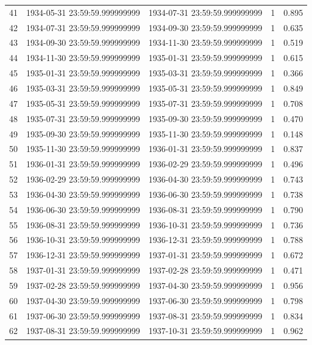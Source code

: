 \begin{table}
\begin{tabular}{lcccc}
41 & 1934-05-31 23:59:59.999999999 & 1934-07-31 23:59:59.999999999 & 1 & 0.895 \\
42 & 1934-07-31 23:59:59.999999999 & 1934-09-30 23:59:59.999999999 & 1 & 0.635 \\
43 & 1934-09-30 23:59:59.999999999 & 1934-11-30 23:59:59.999999999 & 1 & 0.519 \\
44 & 1934-11-30 23:59:59.999999999 & 1935-01-31 23:59:59.999999999 & 1 & 0.615 \\
45 & 1935-01-31 23:59:59.999999999 & 1935-03-31 23:59:59.999999999 & 1 & 0.366 \\
46 & 1935-03-31 23:59:59.999999999 & 1935-05-31 23:59:59.999999999 & 1 & 0.849 \\
47 & 1935-05-31 23:59:59.999999999 & 1935-07-31 23:59:59.999999999 & 1 & 0.708 \\
48 & 1935-07-31 23:59:59.999999999 & 1935-09-30 23:59:59.999999999 & 1 & 0.470 \\
49 & 1935-09-30 23:59:59.999999999 & 1935-11-30 23:59:59.999999999 & 1 & 0.148 \\
50 & 1935-11-30 23:59:59.999999999 & 1936-01-31 23:59:59.999999999 & 1 & 0.837 \\
51 & 1936-01-31 23:59:59.999999999 & 1936-02-29 23:59:59.999999999 & 1 & 0.496 \\
52 & 1936-02-29 23:59:59.999999999 & 1936-04-30 23:59:59.999999999 & 1 & 0.743 \\
53 & 1936-04-30 23:59:59.999999999 & 1936-06-30 23:59:59.999999999 & 1 & 0.738 \\
54 & 1936-06-30 23:59:59.999999999 & 1936-08-31 23:59:59.999999999 & 1 & 0.790 \\
55 & 1936-08-31 23:59:59.999999999 & 1936-10-31 23:59:59.999999999 & 1 & 0.736 \\
56 & 1936-10-31 23:59:59.999999999 & 1936-12-31 23:59:59.999999999 & 1 & 0.788 \\
57 & 1936-12-31 23:59:59.999999999 & 1937-01-31 23:59:59.999999999 & 1 & 0.672 \\
58 & 1937-01-31 23:59:59.999999999 & 1937-02-28 23:59:59.999999999 & 1 & 0.471 \\
59 & 1937-02-28 23:59:59.999999999 & 1937-04-30 23:59:59.999999999 & 1 & 0.956 \\
60 & 1937-04-30 23:59:59.999999999 & 1937-06-30 23:59:59.999999999 & 1 & 0.798 \\
61 & 1937-06-30 23:59:59.999999999 & 1937-08-31 23:59:59.999999999 & 1 & 0.834 \\
62 & 1937-08-31 23:59:59.999999999 & 1937-10-31 23:59:59.999999999 & 1 & 0.962 \\

\end{tabular}
\end{table}
